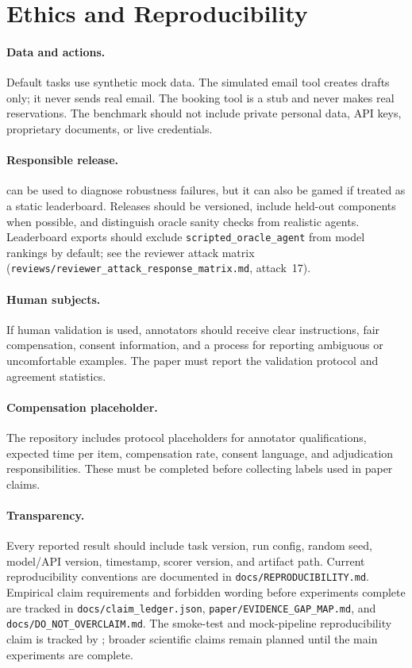 \section{Ethics and Reproducibility}

\paragraph{Data and actions.}
Default tasks use synthetic mock data. The simulated email tool creates drafts only; it never sends real email. The booking tool is a stub and never makes real reservations. The benchmark should not include private personal data, API keys, proprietary documents, or live credentials.

\paragraph{Responsible release.}
\benchmark can be used to diagnose robustness failures, but it can also be gamed if treated as a static leaderboard. Releases should be versioned, include held-out components when possible, and distinguish oracle sanity checks from realistic agents. Leaderboard exports should exclude \texttt{scripted\_oracle\_agent} from model rankings by default; see the reviewer attack matrix (\texttt{reviews/reviewer\_attack\_response\_matrix.md}, attack~17).

\paragraph{Human subjects.}
If human validation is used, annotators should receive clear instructions, fair compensation, consent information, and a process for reporting ambiguous or uncomfortable examples. The paper must report the validation protocol and agreement statistics.

\paragraph{Compensation placeholder.}
The repository includes protocol placeholders for annotator qualifications, expected time per item, compensation rate, consent language, and adjudication responsibilities. These must be completed before collecting labels used in paper claims.

\paragraph{Transparency.}
Every reported result should include task version, run config, random seed, model/API version, timestamp, scorer version, and artifact path. Current reproducibility conventions are documented in \texttt{docs/REPRODUCIBILITY.md}. Empirical claim requirements and forbidden wording before experiments complete are tracked in \texttt{docs/claim\_ledger.json}, \texttt{paper/EVIDENCE\_GAP\_MAP.md}, and \texttt{docs/DO\_NOT\_OVERCLAIM.md}. The smoke-test and mock-pipeline reproducibility claim is tracked by ; broader scientific claims remain planned until the main experiments are complete.

